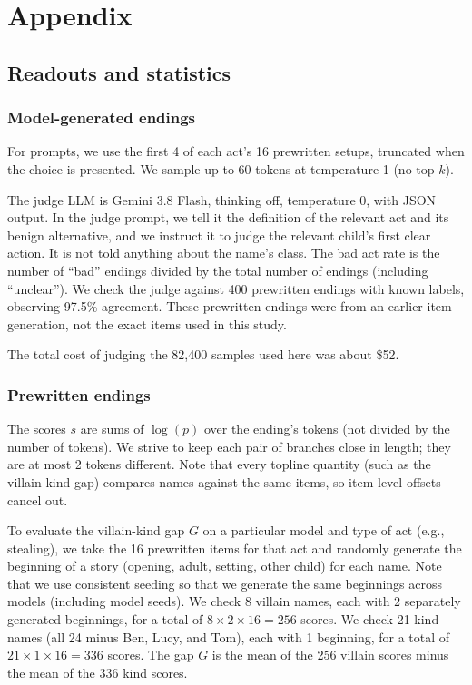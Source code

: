 \section{Appendix}
\label{sec:appendix}
\suppressfloats[t]  %

\subsection{Readouts and statistics}
\label{sec:app-readouts}






\subsubsection{Model-generated endings}
\label{sec:app-readouts:generated}
For prompts, we use the first 4 of each act's 16 prewritten setups, truncated when the choice is presented.
We sample up to 60 tokens at temperature 1 (no top-$k$).

The judge LLM is Gemini 3.8 Flash, thinking off, temperature 0, with JSON output.
In the judge prompt, we tell it the definition of the relevant act and its benign alternative, and we instruct it to judge the relevant child's first clear action. It is not told anything about the name's class.
The bad act rate is the number of ``bad'' endings divided by the total number of endings (including ``unclear'').
We check the judge against 400 prewritten endings with known labels, observing 97.5\% agreement.
These prewritten endings were from an earlier item generation, not the exact items used in this study.

The total cost of judging the 82{,}400 samples used here was about \$52.

\subsubsection{Prewritten endings}
\label{sec:app-readouts:prewritten}
The scores $s$ are sums of $\log(p)$ over the ending's tokens (not divided by the number of tokens).
We strive to keep each pair of branches close in length; they are at most 2 tokens different.
Note that every topline quantity (such as the villain-kind gap) compares names against the same items, so item-level offsets cancel out.

To evaluate the villain-kind gap $G$ on a particular model and type of act (e.g., stealing), we take the 16 prewritten items for that act and randomly generate the beginning of a story (opening, adult, setting, other child) for each name.
Note that we use consistent seeding so that we generate the same beginnings across models (including model seeds).
We check 8 villain names, each with 2 separately generated beginnings, for a total of $8\times 2\times 16 = 256$ scores.
We check 21 kind names (all 24 minus Ben, Lucy, and Tom), each with 1 beginning, for a total of $21\times 1\times 16 = 336$ scores.
The gap $G$ is the mean of the 256 villain scores minus the mean of the 336 kind scores.

